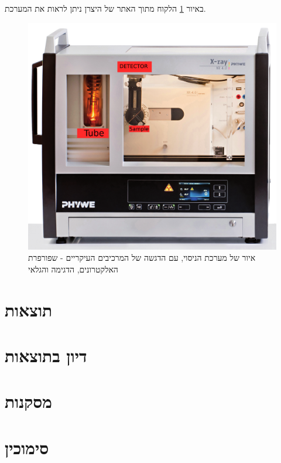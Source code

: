 \documentclass{article}
\begin{document}
באיור
\ref{fig:experiment_scheme}
הלקוח מתוך האתר של היצרן ניתן לראות את המערכת.

\begin{figure}
    \centering
    \includegraphics[width=\textwidth]{./system.png}
    \caption{
    איור של מערכת הניסוי, עם הדגשה של המרכיבים העיקריים - שפורפרת האלקטרונים, הדגימה והגלאי
    }
    \label{fig:experiment_scheme}
\end{figure}

\section{תוצאות}

\section{דיון בתוצאות}

\section{מסקנות}

\section*{סימוכין}
\begin{english}
\printbibliography[heading=none]{}
\end{english}
\end{document}
